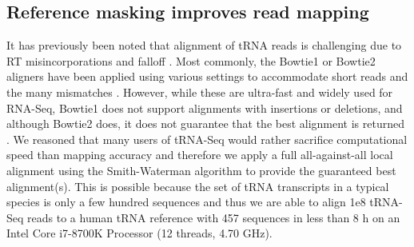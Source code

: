 \documentclass[9pt,lineno]{elife}
\begin{document}
\begin{figure}[ht!]
\label{figsupp:f2S9}

\end{figure}


 

\subsection{Reference masking improves read mapping}
It has previously been noted that alignment of tRNA reads is challenging due to RT misincorporations and falloff \citep{Hoffmann2018-uz, Behrens2021-gb}.
Most commonly, the Bowtie1 or Bowtie2 aligners have been applied using various settings to accommodate short reads and the many mismatches \citep{Cozen2015-cx, Zheng2015-kj, Clark2016-ph, Evans2017-st, Pinkard2020-yd}.
However, while these are ultra-fast and widely used for RNA-Seq, Bowtie1 does not support alignments with insertions or deletions, and although Bowtie2 does, it does not guarantee that the best alignment is returned \citep{Langmead2009-yx, Langmead2012-ui}.
We reasoned that many users of tRNA-Seq would rather sacrifice computational speed than mapping accuracy and therefore we apply a full all-against-all local alignment using the Smith-Waterman algorithm to provide the guaranteed best alignment(s).
This is possible because the set of tRNA transcripts in a typical species is only a few hundred sequences and thus we are able to align 1e8 tRNA-Seq reads to a human tRNA reference with 457 sequences in less than 8 h on an Intel Core i7-8700K Processor (12 threads, 4.70 GHz).
\end{document}
